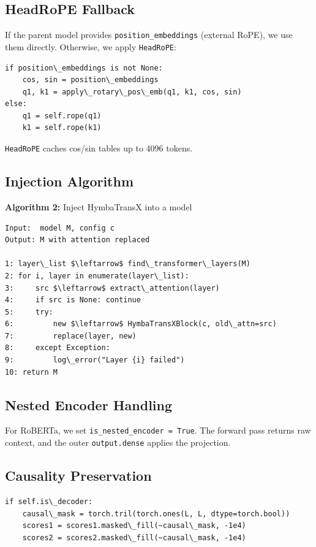 \subsection{HeadRoPE Fallback}

If the parent model provides \texttt{position\_embeddings} (external RoPE), we use 
them directly. Otherwise, we apply \texttt{HeadRoPE}:

\begin{lstlisting}
if position\_embeddings is not None:
    cos, sin = position\_embeddings
    q1, k1 = apply\_rotary\_pos\_emb(q1, k1, cos, sin)
else:
    q1 = self.rope(q1)
    k1 = self.rope(k1)
\end{lstlisting}

\texttt{HeadRoPE} caches cos/sin tables up to 4096 tokens.

\subsection{Injection Algorithm}

\textbf{Algorithm 2:} Inject HymbaTransX into a model
\begin{lstlisting}
Input:  model M, config c
Output: M with attention replaced

1: layer\_list $\leftarrow$ find\_transformer\_layers(M)
2: for i, layer in enumerate(layer\_list):
3:     src $\leftarrow$ extract\_attention(layer)
4:     if src is None: continue
5:     try:
6:         new $\leftarrow$ HymbaTransXBlock(c, old\_attn=src)
7:         replace(layer, new)
8:     except Exception:
9:         log\_error("Layer {i} failed")
10: return M
\end{lstlisting}

\subsection{Nested Encoder Handling}

For RoBERTa, we set \texttt{is\_nested\_encoder = True}. The forward pass returns 
raw context, and the outer \texttt{output.dense} applies the projection.

\subsection{Causality Preservation}

\begin{lstlisting}
if self.is\_decoder:
    causal\_mask = torch.tril(torch.ones(L, L, dtype=torch.bool))
    scores1 = scores1.masked\_fill(~causal\_mask, -1e4)
    scores2 = scores2.masked\_fill(~causal\_mask, -1e4)
\end{lstlisting}

